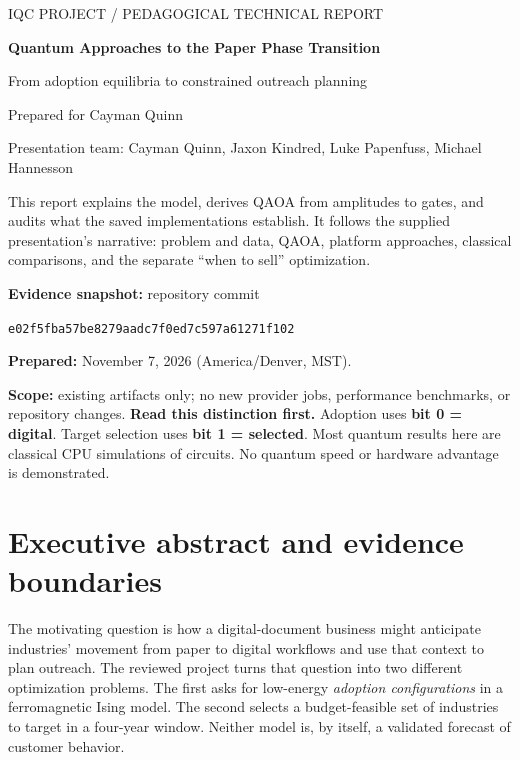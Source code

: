 \documentclass[11pt,letterpaper]{article}
\newcommand{\page}{\clearpage}
\newcommand{\file}[1]{\nolinkurl{#1}}
\begin{document}
\begin{titlepage}
\color{ink}\sffamily
{\small IQC PROJECT / PEDAGOGICAL TECHNICAL REPORT}\par\vspace{1.3cm}
{\Huge\bfseries Quantum Approaches to the Paper Phase Transition\par}
\vspace{0.7cm}
{\LARGE From adoption equilibria to constrained outreach planning\par}
\vspace{0.9cm}
{\Large Prepared for Cayman Quinn}\par
{\large Presentation team: Cayman Quinn, Jaxon Kindred, Luke Papenfuss, Michael Hannesson}\par
\vspace{1cm}\normalfont\color{black}
This report explains the model, derives QAOA from amplitudes to gates, and audits what the saved implementations establish. It follows the supplied presentation's narrative: problem and data, QAOA, platform approaches, classical comparisons, and the separate ``when to sell'' optimization.

\vspace{0.5cm}
\textbf{Evidence snapshot:} repository commit\par
\file{e02f5fba57be8279aadc7f0ed7c597a61271f102}\par
\textbf{Prepared:} November 7, 2026 (America/Denver, MST).\par
\textbf{Scope:} existing artifacts only; no new provider jobs, performance benchmarks, or repository changes.
\vfill
\textbf{Read this distinction first.} Adoption uses \textbf{bit 0 = digital}. Target selection uses \textbf{bit 1 = selected}. Most quantum results here are classical CPU simulations of circuits. No quantum speed or hardware advantage is demonstrated.
\end{titlepage}
\hypersetup{pageanchor=true}
\setcounter{tocdepth}{1}
\tableofcontents
\page
\section{Executive abstract and evidence boundaries}\label{sec:scope}
The motivating question is how a digital-document business might anticipate industries' movement from paper to digital workflows and use that context to plan outreach. The reviewed project turns that question into two different optimization problems. The first asks for low-energy \emph{adoption configurations} in a ferromagnetic Ising model. The second selects a budget-feasible set of industries to target in a four-year window. Neither model is, by itself, a validated forecast of customer behavior.
\end{document}

